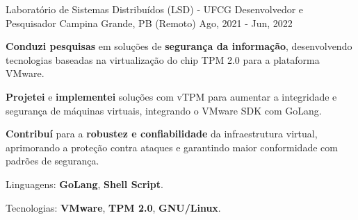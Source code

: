 \begin{cventries}
  \cventry
  {Laboratório de Sistemas Distribuídos (LSD) - UFCG} %
  {Desenvolvedor e Pesquisador} %
  {Campina Grande, PB (Remoto)} %
  {Ago, 2021 - Jun, 2022} %
  {
    \begin{cvitems}
      \item {\textbf{Conduzi pesquisas} em soluções de \textbf{segurança da informação}, desenvolvendo tecnologias baseadas na virtualização do chip  {TPM 2.0} para a plataforma  {VMware}.}
      \item {\textbf{Projetei} e \textbf{implementei} soluções com {vTPM} para aumentar a integridade e segurança de máquinas virtuais, integrando o {VMware SDK} com {GoLang}.}
      \item {\textbf{Contribuí} para a \textbf{robustez e confiabilidade} da infraestrutura virtual, aprimorando a proteção contra ataques e garantindo maior conformidade com padrões de segurança.}
      \item {Linguagens: \textbf{GoLang}, \textbf{Shell Script}.}
      \item {Tecnologias: \textbf{VMware}, \textbf{TPM 2.0}, \textbf{GNU/Linux}.}
    \end{cvitems}
  }



\end{cventries}
